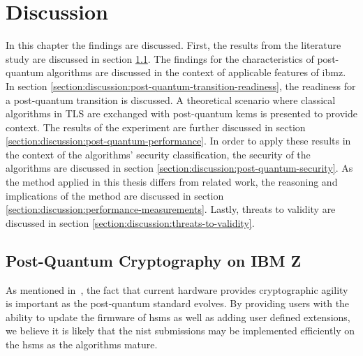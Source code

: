 \chapter{Discussion}
\label{chapter:discussion}

In this chapter the findings are discussed. First, the results from the literature study are discussed in section \ref{section:discussion:post-quantum-on-ibm-z}. The findings for the characteristics of \gls{post-quantum} algorithms are discussed in the context of applicable features of \gls{ibmz}. In section \ref{section:discussion:post-quantum-transition-readiness}, the readiness for a \gls{post-quantum} transition is discussed. A theoretical scenario where classical algorithms in TLS are exchanged with \gls{post-quantum} \glspl{kem} is presented to provide context. The results of the experiment are further discussed in section \ref{section:discussion:post-quantum-performance}. In order to apply these results in the context of the algorithms' security classification, the security of the algorithms are discussed in section \ref{section:discussion:post-quantum-security}. As the method applied in this thesis differs from related work, the reasoning and implications of the method are discussed in section \ref{section:discussion:performance-measurements}. Lastly, threats to validity are discussed in section \ref{section:discussion:threats-to-validity}.

\section{Post-Quantum Cryptography on IBM Z}
\label{section:discussion:post-quantum-on-ibm-z}

As mentioned in~\cite{microsoft2020, ibm:z15:2019}, the fact that current hardware provides cryptographic agility is important as the \gls{post-quantum} standard evolves. By providing users with the ability to update the firmware of \glspl{hsm} as well as adding user defined extensions, we believe it is likely that the \gls{nist} submissions may be implemented efficiently on the \glspl{hsm} as the algorithms mature.

